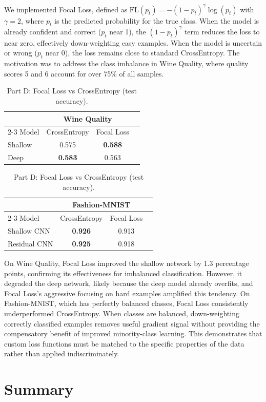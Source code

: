 \documentclass[11pt,a4paper]{article}
\begin{document}
We implemented Focal Loss, defined as $\text{FL}(p_t) = -(1 - p_t)^\gamma \log(p_t)$ with $\gamma = 2$, where $p_t$ is the predicted probability for the true class. When the model is already confident and correct ($p_t$ near 1), the $(1 - p_t)^\gamma$ term reduces the loss to near zero, effectively down-weighting easy examples. When the model is uncertain or wrong ($p_t$ near 0), the loss remains close to standard CrossEntropy. The motivation was to address the class imbalance in Wine Quality, where quality scores 5 and 6 account for over 75\% of all samples.

\begin{table}[H]
\centering
\begin{tabular}{lccc}
\toprule
& \multicolumn{2}{c}{Wine Quality} \\
\cmidrule(lr){2-3}
Model & CrossEntropy & Focal Loss \\
\midrule
Shallow & 0.575 & \textbf{0.588} \\
Deep & \textbf{0.583} & 0.563 \\
\bottomrule
\end{tabular}
\quad
\begin{tabular}{lccc}
\toprule
& \multicolumn{2}{c}{Fashion-MNIST} \\
\cmidrule(lr){2-3}
Model & CrossEntropy & Focal Loss \\
\midrule
Shallow CNN & \textbf{0.926} & 0.913 \\
Residual CNN & \textbf{0.925} & 0.918 \\
\bottomrule
\end{tabular}
\caption{Part D: Focal Loss vs CrossEntropy (test accuracy).}
\end{table}

On Wine Quality, Focal Loss improved the shallow network by 1.3 percentage points, confirming its effectiveness for imbalanced classification. However, it degraded the deep network, likely because the deep model already overfits, and Focal Loss's aggressive focusing on hard examples amplified this tendency. On Fashion-MNIST, which has perfectly balanced classes, Focal Loss consistently underperformed CrossEntropy. When classes are balanced, down-weighting correctly classified examples removes useful gradient signal without providing the compensatory benefit of improved minority-class learning. This demonstrates that custom loss functions must be matched to the specific properties of the data rather than applied indiscriminately.

\section{Summary}
\end{document}
